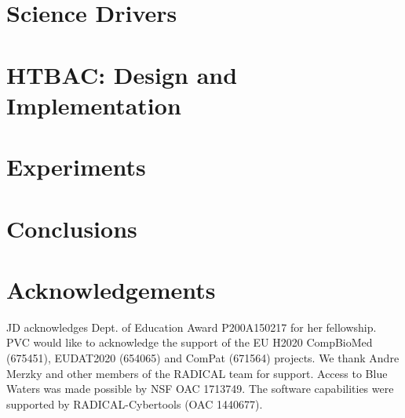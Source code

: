 \documentclass{llncs}
\begin{document}
\section{Science Drivers}
\label{sec:science-drivers}



\section{HTBAC: Design and Implementation}


\section{Experiments}


%

\section{Conclusions}


\section{Acknowledgements}
%

JD acknowledges Dept. of Education Award P200A150217 for her fellowship. PVC
would like to acknowledge the support of the EU H2020 CompBioMed (675451),
EUDAT2020 (654065) and ComPat (671564) projects. We thank Andre Merzky and
other members of the RADICAL team for support. Access to Blue Waters was made
possible by NSF OAC 1713749. The software capabilities were supported by
RADICAL-Cybertools (OAC 1440677).

\newpage



\end{document}
